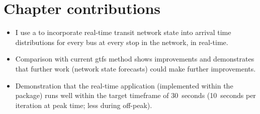 \section{Chapter contributions}
\label{sec:pred_contrib}

\begin{itemize}
\item I use a \pf{} to incorporate real-time transit network state into arrival time distributions for every bus at every stop in the network, in real-time.

\item Comparison with current \gls{gtfs} method shows improvements and demonstrates that further work (network state forecasts) could make further improvements.

\item Demonstration that the real-time application (implemented within the  package) runs well within the target timeframe of 30~seconds (10~seconds per iteration at peak time; less during off-peak).
\end{itemize}
